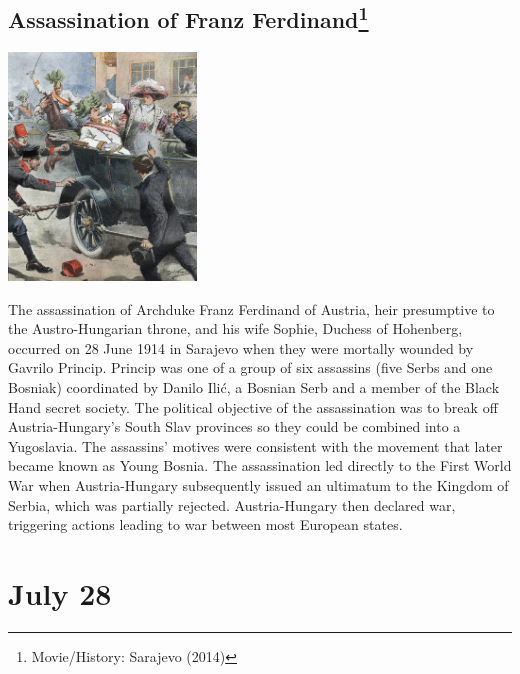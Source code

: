 \documentclass[11pt]{report}
\begin{document}
\subsection{Assassination of Franz Ferdinand\protect\footnote{Movie/History: Sarajevo (2014)}}
\vspace{2mm}\begin{center}\includegraphics[width=5cm]{./img/franzFerdinand.jpg}\end{center}
The assassination of Archduke Franz Ferdinand of Austria, heir presumptive to the Austro-Hungarian throne, and his wife Sophie, Duchess of Hohenberg, occurred on 28 June 1914 in Sarajevo when they were mortally wounded by Gavrilo Princip. Princip was one of a group of six assassins (five Serbs and one Bosniak) coordinated by Danilo Ilić, a Bosnian Serb and a member of the Black Hand secret society. The political objective of the assassination was to break off Austria-Hungary's South Slav provinces so they could be combined into a Yugoslavia. The assassins' motives were consistent with the movement that later became known as Young Bosnia. The assassination led directly to the First World War when Austria-Hungary subsequently issued an ultimatum to the Kingdom of Serbia, which was partially rejected. Austria-Hungary then declared war, triggering actions leading to war between most European states.
\section{July 28}
\end{document}
